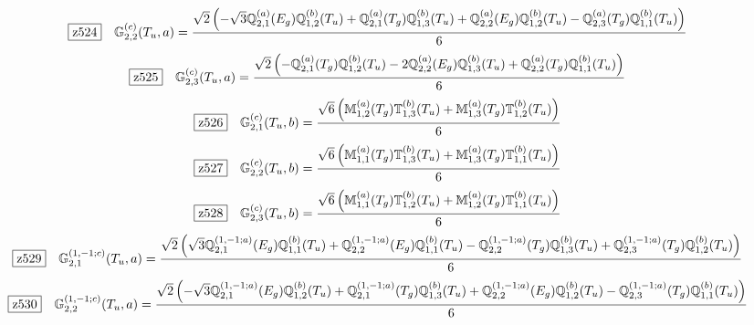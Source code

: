 \documentclass[fleqn,10pt,landscape]{jsarticle}
\begin{document}
\begin{dmath*}
\hspace*{3mm}\fbox{z524}\quad \mathbb{G}_{2,2}^{(c)}(T_{u},a)=\frac{\sqrt{2} \left(- \sqrt{3} \mathbb{Q}_{2,1}^{(a)}(E_{g}) \mathbb{Q}_{1,2}^{(b)}(T_{u}) + \mathbb{Q}_{2,1}^{(a)}(T_{g}) \mathbb{Q}_{1,3}^{(b)}(T_{u}) + \mathbb{Q}_{2,2}^{(a)}(E_{g}) \mathbb{Q}_{1,2}^{(b)}(T_{u}) - \mathbb{Q}_{2,3}^{(a)}(T_{g}) \mathbb{Q}_{1,1}^{(b)}(T_{u})\right)}{6}
\end{dmath*}
\begin{dmath*}
\hspace*{3mm}\fbox{z525}\quad \mathbb{G}_{2,3}^{(c)}(T_{u},a)=\frac{\sqrt{2} \left(- \mathbb{Q}_{2,1}^{(a)}(T_{g}) \mathbb{Q}_{1,2}^{(b)}(T_{u}) - 2 \mathbb{Q}_{2,2}^{(a)}(E_{g}) \mathbb{Q}_{1,3}^{(b)}(T_{u}) + \mathbb{Q}_{2,2}^{(a)}(T_{g}) \mathbb{Q}_{1,1}^{(b)}(T_{u})\right)}{6}
\end{dmath*}
\begin{dmath*}
\hspace*{3mm}\fbox{z526}\quad \mathbb{G}_{2,1}^{(c)}(T_{u},b)=\frac{\sqrt{6} \left(\mathbb{M}_{1,2}^{(a)}(T_{g}) \mathbb{T}_{1,3}^{(b)}(T_{u}) + \mathbb{M}_{1,3}^{(a)}(T_{g}) \mathbb{T}_{1,2}^{(b)}(T_{u})\right)}{6}
\end{dmath*}
\begin{dmath*}
\hspace*{3mm}\fbox{z527}\quad \mathbb{G}_{2,2}^{(c)}(T_{u},b)=\frac{\sqrt{6} \left(\mathbb{M}_{1,1}^{(a)}(T_{g}) \mathbb{T}_{1,3}^{(b)}(T_{u}) + \mathbb{M}_{1,3}^{(a)}(T_{g}) \mathbb{T}_{1,1}^{(b)}(T_{u})\right)}{6}
\end{dmath*}
\begin{dmath*}
\hspace*{3mm}\fbox{z528}\quad \mathbb{G}_{2,3}^{(c)}(T_{u},b)=\frac{\sqrt{6} \left(\mathbb{M}_{1,1}^{(a)}(T_{g}) \mathbb{T}_{1,2}^{(b)}(T_{u}) + \mathbb{M}_{1,2}^{(a)}(T_{g}) \mathbb{T}_{1,1}^{(b)}(T_{u})\right)}{6}
\end{dmath*}
\begin{dmath*}
\hspace*{3mm}\fbox{z529}\quad \mathbb{G}_{2,1}^{(1,-1;c)}(T_{u},a)=\frac{\sqrt{2} \left(\sqrt{3} \mathbb{Q}_{2,1}^{(1,-1;a)}(E_{g}) \mathbb{Q}_{1,1}^{(b)}(T_{u}) + \mathbb{Q}_{2,2}^{(1,-1;a)}(E_{g}) \mathbb{Q}_{1,1}^{(b)}(T_{u}) - \mathbb{Q}_{2,2}^{(1,-1;a)}(T_{g}) \mathbb{Q}_{1,3}^{(b)}(T_{u}) + \mathbb{Q}_{2,3}^{(1,-1;a)}(T_{g}) \mathbb{Q}_{1,2}^{(b)}(T_{u})\right)}{6}
\end{dmath*}
\begin{dmath*}
\hspace*{3mm}\fbox{z530}\quad \mathbb{G}_{2,2}^{(1,-1;c)}(T_{u},a)=\frac{\sqrt{2} \left(- \sqrt{3} \mathbb{Q}_{2,1}^{(1,-1;a)}(E_{g}) \mathbb{Q}_{1,2}^{(b)}(T_{u}) + \mathbb{Q}_{2,1}^{(1,-1;a)}(T_{g}) \mathbb{Q}_{1,3}^{(b)}(T_{u}) + \mathbb{Q}_{2,2}^{(1,-1;a)}(E_{g}) \mathbb{Q}_{1,2}^{(b)}(T_{u}) - \mathbb{Q}_{2,3}^{(1,-1;a)}(T_{g}) \mathbb{Q}_{1,1}^{(b)}(T_{u})\right)}{6}
\end{dmath*}
\end{document}
